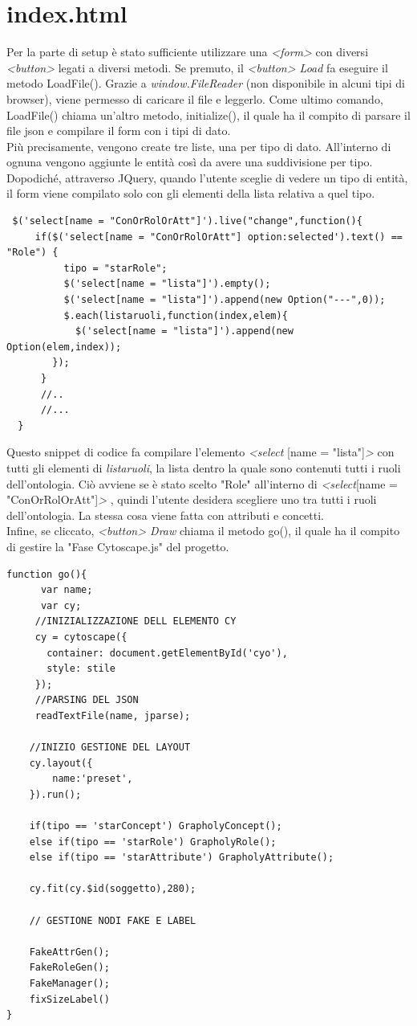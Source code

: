 \documentclass[Lau,binding=0.6cm]{sapthesis}
\begin{document}
\section{index.html}
Per la parte di setup è stato sufficiente utilizzare una \textit{<form>} con diversi \textit{<button>} legati a diversi metodi. Se premuto, il \textit{<button> Load} fa eseguire il metodo LoadFile(). Grazie a \textit{window.FileReader} (non disponibile in alcuni tipi di browser), viene permesso di caricare il file e leggerlo. Come ultimo comando, LoadFile() chiama un'altro metodo, initialize(), il quale ha il compito di parsare il file json e compilare il form con i tipi di dato.\\ Più precisamente, vengono create tre liste, una per tipo di dato. All'interno di ognuna vengono aggiunte le entità così da avere una suddivisione per tipo. Dopodiché, attraverso JQuery, quando l'utente sceglie di vedere un tipo di entità, il form viene compilato solo con gli elementi della lista relativa a quel tipo. 
\begin{verbatim}
 $('select[name = "ConOrRolOrAtt"]').live("change",function(){
     if($('select[name = "ConOrRolOrAtt"] option:selected').text() == "Role") {
          tipo = "starRole";
          $('select[name = "lista"]').empty();
          $('select[name = "lista"]').append(new Option("---",0));
          $.each(listaruoli,function(index,elem){
          	$('select[name = "lista"]').append(new Option(elem,index));
     	});
      }
      //..
      //...
  }
\end{verbatim}
Questo snippet di codice fa compilare l'elemento \textit{<select} [name = "lista"]\textit{>} con tutti gli elementi di \textit{listaruoli}, la lista dentro la quale sono contenuti tutti i ruoli dell'ontologia. Ciò avviene se è stato scelto "Role" all'interno di \textit{<select}[name = "ConOrRolOrAtt"]\textit{>} , quindi l'utente desidera scegliere uno tra tutti i ruoli dell'ontologia. La stessa cosa viene fatta con attributi e concetti.
\\Infine, se cliccato, \textit{<button> Draw} chiama il metodo go(), il quale ha il compito di gestire la "Fase Cytoscape.js" del progetto.
\begin{verbatim}
function go(){
      var name;
      var cy;
     //INIZIALIZZAZIONE DELL ELEMENTO CY 
     cy = cytoscape({
       container: document.getElementById('cyo'),
       style: stile
     });
     //PARSING DEL JSON
     readTextFile(name, jparse);
            
    //INIZIO GESTIONE DEL LAYOUT         
    cy.layout({
        name:'preset',
    }).run(); 
            
    if(tipo == 'starConcept') GrapholyConcept();
    else if(tipo == 'starRole') GrapholyRole();
    else if(tipo == 'starAttribute') GrapholyAttribute();

    cy.fit(cy.$id(soggetto),280);

    // GESTIONE NODI FAKE E LABEL

    FakeAttrGen();
    FakeRoleGen();
    FakeManager();
    fixSizeLabel()
}
\end{verbatim}
\end{document}
